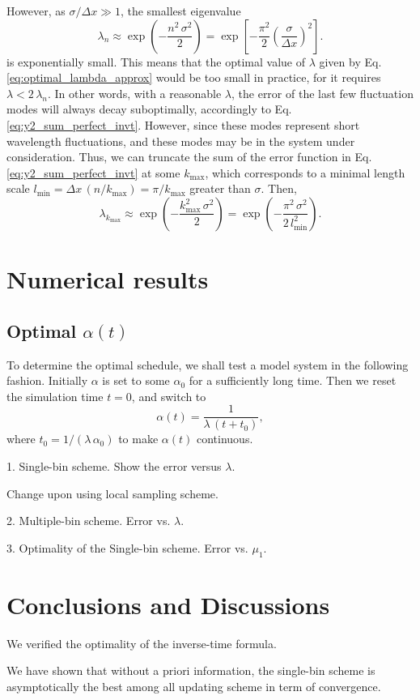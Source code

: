 \documentclass[reprint]{revtex4-1}
\begin{document}
However,
as $\sigma/\Delta x \gg 1$,
the smallest eigenvalue
%
$$
\lambda_n
\approx
\exp\left(
      -\frac{ n^2 \, \sigma^2 }
            {        2        }
    \right)
=
\exp\left[
      -\frac{ \pi^2 }{ 2 }
      \left(
        \frac{  \sigma }
             { \Delta x }
      \right)^2
    \right]
.
$$
%
is exponentially small.
%
This means that
the optimal value of $\lambda$
given by Eq. \eqref{eq:optimal_lambda_approx}
would be too small in practice,
for it requires $\lambda < 2 \, \lambda_n$.
%
In other words,
with a reasonable $\lambda$,
the error of the last few fluctuation modes
will always decay suboptimally,
accordingly to Eq. \eqref{eq:y2_sum_perfect_invt}.
%
However, since these modes
represent short wavelength fluctuations,
and these modes may be in
the system under consideration.
%
Thus,
we can truncate the sum of the error function
in Eq. \eqref{eq:y2_sum_perfect_invt}
at some $k_{\max}$,
which corresponds to a minimal length scale
$l_{\min} = \Delta x \, (n /k_{\max}) = \pi/k_{\max}$
greater than $\sigma$.
%
Then,
$$
\lambda_{ k_{\max} }
\approx
\exp\left(
      -\frac{ k_{\max}^2 \, \sigma^2 }
            {           2            }
    \right)
=
\exp\left(
      -\frac{  \pi^2 \, \sigma^2    }
            {    2 \, l_{\min}^2  }
    \right).
$$




\section{\label{sec:results}
Numerical results}


\subsection{Optimal $\alpha(t)$}


To determine the optimal schedule,
we shall test a model system
in the following fashion.
%
Initially $\alpha$ is set to some $\alpha_0$
for a sufficiently long time.
%
Then we reset the simulation time $t = 0$,
and switch to
$$
\alpha(t) = \frac{ 1 } { \lambda \, (t + t_0) },
$$
where $t_0 = 1/(\lambda \, \alpha_0)$
to make $\alpha(t)$ continuous.


1. Single-bin scheme.
Show the error versus $\lambda$.

Change upon using local sampling scheme.


2. Multiple-bin scheme.
Error vs. $\lambda$.

3. Optimality of the Single-bin scheme.
Error vs. $\mu_1$.


\section{\label{sec:conclusion}
Conclusions and Discussions}


We verified the optimality of the inverse-time formula.

We have shown that
without a priori information,
the single-bin scheme is asymptotically
the best among all updating scheme
in term of convergence.



\end{document}
